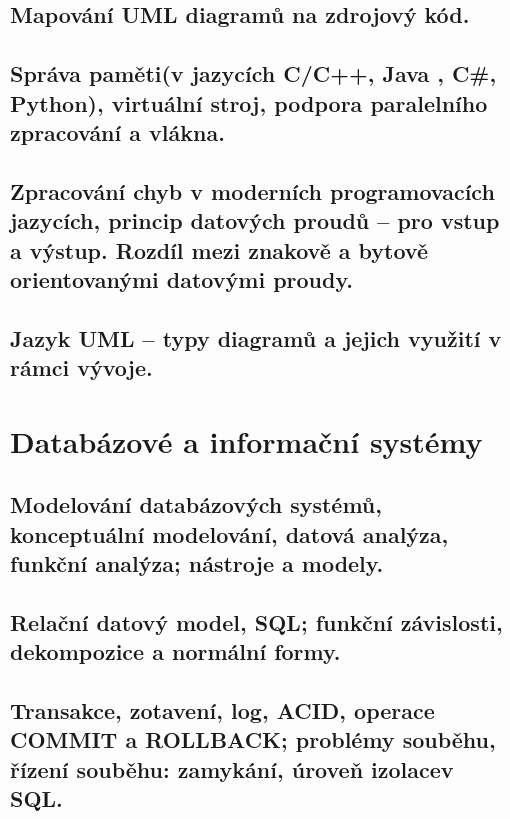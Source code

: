 \documentclass[openany]{book}
\begin{document}
\chapter{Mapování UML diagramů na zdrojový kód.}


\chapter{Správa paměti(v jazycích C/C++, Java , C\#, Python), virtuální stroj, podpora paralelního zpracování a vlákna.}


\chapter{Zpracování chyb v moderních programovacích jazycích, princip datových proudů – pro vstup a výstup. Rozdíl mezi znakově a bytově orientovanými datovými proudy.}


\chapter{Jazyk UML – typy diagramů a jejich využití v rámci vývoje.}


\part{Databázové a informační systémy}

\chapter{Modelování databázových systémů, konceptuální modelování, datová analýza, funkční analýza; nástroje a modely. }


\chapter{Relační datový model, SQL; funkční závislosti, dekompozice a normální formy.}


\chapter{Transakce, zotavení, log, ACID, operace COMMIT a ROLLBACK; problémy souběhu, řízení souběhu: zamykání, úroveň izolacev SQL.}

\end{document}
